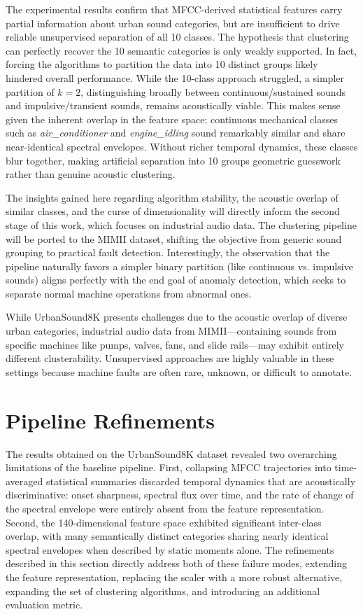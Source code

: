 \documentclass[runningheads,a4paper,11pt]{report}
\begin{document}
The experimental results confirm that MFCC-derived statistical features carry partial information about urban sound categories, but are insufficient to drive reliable unsupervised separation of all 10 classes. The hypothesis that clustering can perfectly recover the 10 semantic categories is only weakly supported. In fact, forcing the algorithms to partition the data into 10 distinct groups likely hindered overall performance. While the 10-class approach struggled, a simpler partition of $k = 2$, distinguishing broadly between continuous/sustained sounds and impulsive/transient sounds, remains acoustically viable. This makes sense given the inherent overlap in the feature space: continuous mechanical classes such as \textit{air\_conditioner} and \textit{engine\_idling} sound remarkably similar and share near-identical spectral envelopes. Without richer temporal dynamics, these classes blur together, making artificial separation into 10 groups geometric guesswork rather than genuine acoustic clustering.

The insights gained here regarding algorithm stability, the acoustic overlap of similar classes, and the curse of dimensionality will directly inform the second stage of this work, which focuses on industrial audio data. The clustering pipeline will be ported to the MIMII dataset, shifting the objective from generic sound grouping to practical fault detection. Interestingly, the observation that the pipeline naturally favors a simpler binary partition (like continuous vs. impulsive sounds) aligns perfectly with the end goal of anomaly detection, which seeks to separate normal machine operations from abnormal ones.

While UrbanSound8K presents challenges due to the acoustic overlap of diverse urban categories, industrial audio data from MIMII---containing sounds from specific machines like pumps, valves, fans, and slide rails---may exhibit entirely different clusterability. Unsupervised approaches are highly valuable in these settings because machine faults are often rare, unknown, or difficult to annotate. 

\section{Pipeline Refinements}
\label{section:pipelineRefinements}

The results obtained on the UrbanSound8K dataset revealed two overarching limitations of the baseline pipeline. First, collapsing MFCC trajectories into time-averaged statistical summaries discarded temporal dynamics that are acoustically discriminative: onset sharpness, spectral flux over time, and the rate of change of the spectral envelope were entirely absent from the feature representation. Second, the 140-dimensional feature space exhibited significant inter-class overlap, with many semantically distinct categories sharing nearly identical spectral envelopes when described by static moments alone. The refinements described in this section directly address both of these failure modes, extending the feature representation, replacing the scaler with a more robust alternative, expanding the set of clustering algorithms, and introducing an additional evaluation metric.
\end{document}
